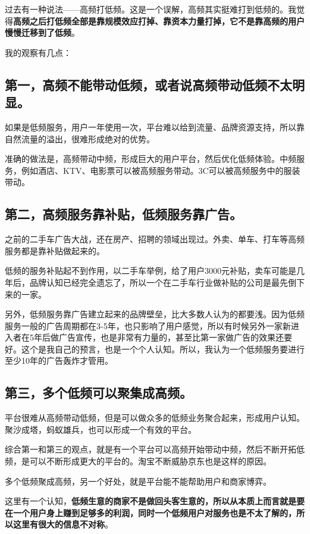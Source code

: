 \documentclass[12pt]{article}
\begin{document}
过去有一种说法——高频打低频。这是一个误解，高频其实挺难打到低频的。我觉得\textbf{高频之后打低频全部是靠规模效应打掉、靠资本力量打掉，它不是靠高频的用户慢慢迁移到了低频}。

我的观察有几点：

\subsection{第一，高频不能带动低频，或者说高频带动低频不太明显。}
如果是低频服务，用户一年使用一次，平台难以给到流量、品牌资源支持，所以靠自然流量的溢出，很难形成绝对的优势。

准确的做法是，高频带动中频，形成巨大的用户平台，然后优化低频体验。中频服务，例如酒店、KTV、电影票可以被高频服务带动。3C可以被高频服务中的服装带动。

\subsection{第二，高频服务靠补贴，低频服务靠广告。}
之前的二手车广告大战，还在房产、招聘的领域出现过。外卖、单车、打车等高频服务都是靠补贴做起来的。

低频的服务补贴起不到作用，以二手车举例，给了用户3000元补贴，卖车可能是几年后，品牌认知已经完全遗忘了，所以一个在二手车行业做补贴的公司是最先倒下来的一家。

另外，低频服务靠广告建立起来的品牌壁垒，比大多数人认为的都要浅。因为低频服务一般的广告周期都在3-5年，也只影响了用户感觉，所以有时候另外一家新进入者在5年后做广告宣传，也是非常有力量的，甚至比第一家做广告的效果还要好。这个是我自己的预言，也是一个个人认知。所以，我认为一个低频服务要进行至少10年的广告轰炸才管用。

\subsection{第三，多个低频可以聚集成高频。}
平台很难从高频带动低频，但是可以做众多的低频业务聚合起来，形成用户认知。聚沙成塔，蚂蚁雄兵，也可以形成一个有效的平台。

综合第一和第三的观点，就是有一个平台可以高频开始带动中频，然后不断开拓低频，是可以不断形成更大的平台的。淘宝不断威胁京东也是这样的原因。

多个低频聚成高频，另一个好处，就是平台能不能帮助用户和商家博弈。

这里有一个认知，\textbf{低频生意的商家不是做回头客生意的，所以从本质上而言就是要在一个用户身上赚到足够多的利润，同时一个低频用户对服务也是不太了解的，所以这里有很大的信息不对称}。
\end{document}
